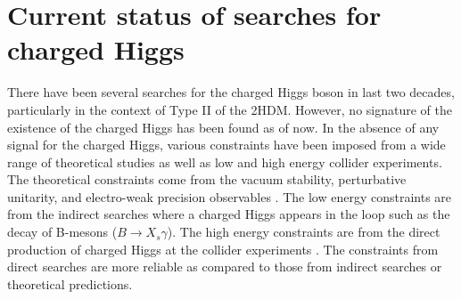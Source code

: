 \section{Current status of searches for charged Higgs}
\label{s:searchHplus}
There have been several searches for the charged Higgs boson in last two decades, 
particularly in the context of Type II of the 2HDM. However, no signature of the 
existence of the charged Higgs has been found
as of now. In the absence of any signal for the charged Higgs, various constraints
have been imposed from a wide range of theoretical studies as well as low and high energy 
collider experiments. The theoretical constraints come from the vacuum stability,
perturbative unitarity, and electro-weak precision observables 
\cite{Arhrib:2018ewj}. The low energy constraints are from the indirect searches
\cite{Akeroyd:2016ymd} where a charged Higgs appears in the loop such as the 
decay of B-mesons ($B \rightarrow X_s\gamma$). The high energy constraints are 
from the direct production of charged Higgs at the collider experiments 
\cite{Achard:2003gt, Heister:2002ev, Abdallah:2003wd, Abbiendi:2008aa,
Aaltonen:2009ke,Abazov:2009aa,Aad:2013hla,Khachatryan:2015uua}. The constraints 
from direct searches are more reliable as compared to those from indirect searches 
or theoretical predictions.

